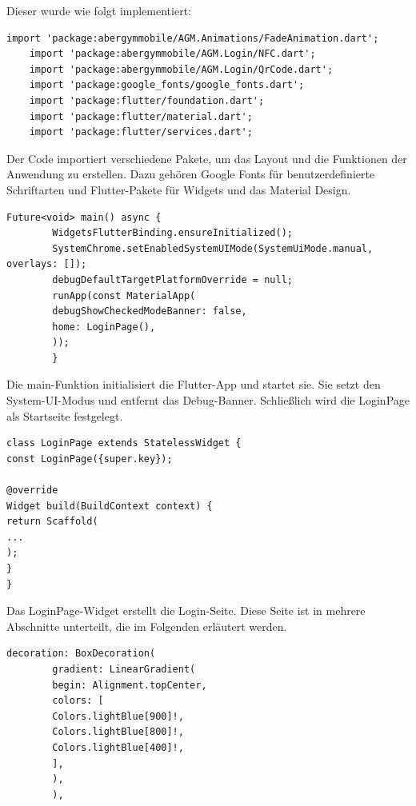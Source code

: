 Dieser wurde wie folgt implementiert:

\begin{lstlisting}[caption=Start-Screen Packages,label=lst:impl:frontend:packages]
    import 'package:abergymmobile/AGM.Animations/FadeAnimation.dart';
    import 'package:abergymmobile/AGM.Login/NFC.dart';
    import 'package:abergymmobile/AGM.Login/QrCode.dart';
    import 'package:google_fonts/google_fonts.dart';
    import 'package:flutter/foundation.dart';
    import 'package:flutter/material.dart';
    import 'package:flutter/services.dart';
\end{lstlisting}

Der Code importiert verschiedene Pakete, um das Layout und die Funktionen der Anwendung zu erstellen. Dazu gehören Google Fonts für benutzerdefinierte Schriftarten und Flutter-Pakete für Widgets und das Material Design.
\pagebreak

\begin{lstlisting}[caption= main-Funktion,label=lst:impl:frontend:main]
    Future<void> main() async {
        WidgetsFlutterBinding.ensureInitialized();
        SystemChrome.setEnabledSystemUIMode(SystemUiMode.manual, overlays: []);
        debugDefaultTargetPlatformOverride = null;
        runApp(const MaterialApp(
        debugShowCheckedModeBanner: false,
        home: LoginPage(),
        ));
        }
\end{lstlisting}

Die main-Funktion initialisiert die Flutter-App und startet sie. Sie setzt den System-UI-Modus und entfernt das Debug-Banner. Schließlich wird die LoginPage als Startseite festgelegt.
\newline

\begin{lstlisting}[caption=Login-Seite,label=lst:impl:frontend:login-seite]
    class LoginPage extends StatelessWidget {
const LoginPage({super.key});

@override
Widget build(BuildContext context) {
return Scaffold(
...
);
}
}
\end{lstlisting}

Das LoginPage-Widget erstellt die Login-Seite. Diese Seite ist in mehrere Abschnitte unterteilt, die im Folgenden erläutert werden.
\newline

\begin{lstlisting}[caption=Layout und Hintergrundfarbe,label=lst:impl:frontend:layout]
    decoration: BoxDecoration(
        gradient: LinearGradient(
        begin: Alignment.topCenter,
        colors: [
        Colors.lightBlue[900]!,
        Colors.lightBlue[800]!,
        Colors.lightBlue[400]!,
        ],
        ),
        ),
\end{lstlisting}

